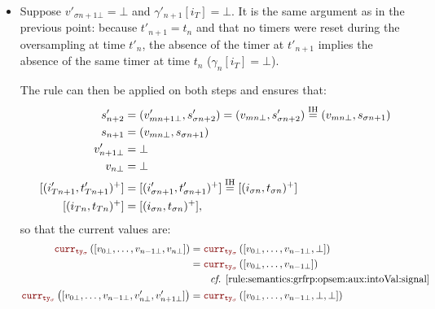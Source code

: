 \begin{skippableproof}
\begin{itemize}
        \item Suppose $v'_{\sigma n+1\bot} = \bot$ and $\gamma'_{n+1}[i_T] = \bot$. It is the same
              argument as in the previous point: because $t'_{n+1} = t_n$ and that no timers were
              reset during the oversampling at time $t'_n$, the absence of the timer at $t'_{n+1}$
              implies the absence of the same timer at time $t_n$ ($\gamma_n[i_T] = \bot$).

              The rule  can then be
              applied on both steps and ensures that:
              \begin{align*}
                  s'_{n+2}                   & = (v'_{mn+1\bot}, s'_{\sigma n+2}) = (v_{mn\bot}, s'_{\sigma n+2}) \overset{\mathrm{IH}}{=} (v_{mn\bot}, s_{\sigma n+1}) \\
                  s_{n+1}                    & = (v_{mn\bot}, s_{\sigma n+1})                                                                            \\
                  v'_{n+1\bot}               & = \bot                                                                                                    \\
                  v_{n\bot}                  & = \bot                                                                                                    \\
                  [(i'_{Tn+1}, t'_{Tn+1})^+] & = [(i'_{\sigma n+1}, t'_{\sigma n+1})^+] \overset{\mathrm{IH}}{=} [(i_{\sigma n}, t_{\sigma n})^+]                       \\
                  [(i_{Tn}, t_{Tn})^+]       & = [(i_{\sigma n}, t_{\sigma n})^+],
              \end{align*}
              so that the current values are:
              \begin{align*}
                  \CurrVal{ty_\sigma}{[v_{0\bot}, \dots, v_{n-1\bot}, v_{n\bot}]}                & = \CurrVal{ty_\sigma}{[v_{0\bot}, \dots, v_{n-1\bot}, \bot]}            \\
                                                                                                 & = \CurrVal{ty_\sigma}{[v_{0\bot}, \dots, v_{n-1\bot}]}                  \\
                                                                                                 & \qquad \text{\cf \Cref{rule:semantics:grfrp:opsem:aux:intoVal:signal}}  \\
                  \CurrVal{ty_\sigma}{[v_{0\bot}, \dots, v_{n-1\bot}, v'_{n\bot}, v'_{n+1\bot}]} & = \CurrVal{ty_\sigma}{[v_{0\bot}, \dots, v_{n-1\bot}, \bot, \bot]}      \\

\end{align*}
\end{itemize}
\end{skippableproof}

